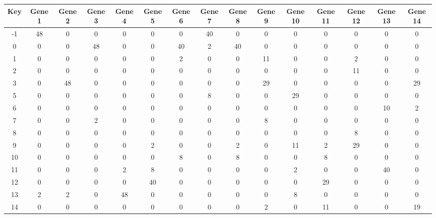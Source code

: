 \begin{tabular}{|c|c|c|c|c|c|c|c|c|c|c|c|c|c|c|}
\hline
Key & Gene 1 & Gene 2 & Gene 3 & Gene 4 & Gene 5 & Gene 6 & Gene 7 & Gene 8 & Gene 9 & Gene 10 & Gene 11 & Gene 12 & Gene 13 & Gene 14 \\
\hline
-1 & 48 & 0 & 0 & 0 & 0 & 0 & 40 & 0 & 0 & 0 & 0 & 0 & 0 & 0 \\
0 & 0 & 0 & 48 & 0 & 0 & 40 & 2 & 40 & 0 & 0 & 0 & 0 & 0 & 0 \\
1 & 0 & 0 & 0 & 0 & 0 & 2 & 0 & 0 & 11 & 0 & 0 & 2 & 0 & 0 \\
2 & 0 & 0 & 0 & 0 & 0 & 0 & 0 & 0 & 0 & 0 & 0 & 11 & 0 & 0 \\
3 & 0 & 48 & 0 & 0 & 0 & 0 & 0 & 0 & 29 & 0 & 0 & 0 & 0 & 29 \\
5 & 0 & 0 & 0 & 0 & 0 & 0 & 8 & 0 & 0 & 29 & 0 & 0 & 0 & 0 \\
6 & 0 & 0 & 0 & 0 & 0 & 0 & 0 & 0 & 0 & 0 & 0 & 0 & 10 & 2 \\
7 & 0 & 0 & 2 & 0 & 0 & 0 & 0 & 0 & 8 & 0 & 0 & 0 & 0 & 0 \\
8 & 0 & 0 & 0 & 0 & 0 & 0 & 0 & 0 & 0 & 0 & 0 & 8 & 0 & 0 \\
9 & 0 & 0 & 0 & 0 & 2 & 0 & 0 & 2 & 0 & 11 & 2 & 29 & 0 & 0 \\
10 & 0 & 0 & 0 & 0 & 0 & 8 & 0 & 8 & 0 & 0 & 8 & 0 & 0 & 0 \\
11 & 0 & 0 & 0 & 2 & 8 & 0 & 0 & 0 & 0 & 2 & 0 & 0 & 40 & 0 \\
12 & 0 & 0 & 0 & 0 & 40 & 0 & 0 & 0 & 0 & 0 & 29 & 0 & 0 & 0 \\
13 & 2 & 2 & 0 & 48 & 0 & 0 & 0 & 0 & 0 & 8 & 0 & 0 & 0 & 0 \\
14 & 0 & 0 & 0 & 0 & 0 & 0 & 0 & 0 & 2 & 0 & 11 & 0 & 0 & 19 \\
\hline
\end{tabular}